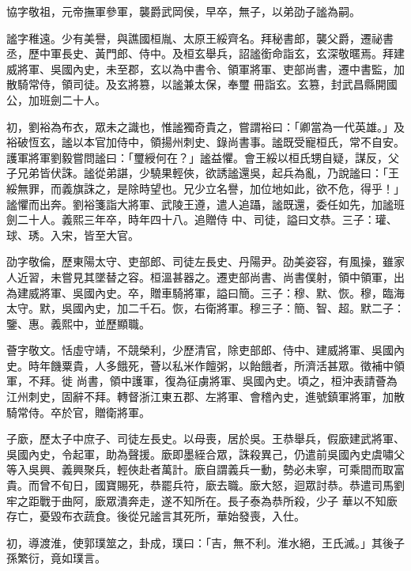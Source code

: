 \begin{pinyinscope}
 協字敬祖，元帝撫軍參軍，襲爵武岡侯，早卒，無子，以弟劭子謐為嗣。



 謐字稚遠。少有美譽，與譙國桓胤、太原王綏齊名。拜秘書郎，襲父爵，遷祕書丞，歷中軍長史、黃門郎、侍中。及桓玄舉兵，詔謐銜命詣玄，玄深敬暱焉。拜建威將軍、吳國內史，未至郡，玄以為中書令、領軍將軍、吏部尚書，遷中書監，加散騎常侍，領司徒。及玄將篡，以謐兼太保，奉璽
 冊詣玄。玄篡，封武昌縣開國公，加班劍二十人。



 初，劉裕為布衣，眾未之識也，惟謐獨奇貴之，嘗謂裕曰：「卿當為一代英雄。」及裕破恆玄，謐以本官加侍中，領揚州刺史、錄尚書事。謐既受寵桓氏，常不自安。護軍將軍劉毅嘗問謐曰：「璽綬何在？」謐益懼。會王綏以桓氏甥自疑，謀反，父子兄弟皆伏誅。謐從弟諶，少驍果輕俠，欲誘謐還吳，起兵為亂，乃說謐曰：「王綏無罪，而義旗誅之，是除時望也。兄少立名譽，加位地如此，欲不危，得乎！」謐懼而出奔。劉裕箋詣大將軍、武陵王遵，遣人追躡，謐既還，委任如先，加謐班劍二十人。義熙三年卒，時年四十八。追贈侍
 中、司徒，謚曰文恭。三子：瓘、球、琇。入宋，皆至大官。



 劭字敬倫，歷東陽太守、吏部郎、司徒左長史、丹陽尹。劭美姿容，有風操，雖家人近習，未嘗見其墜替之容。桓溫甚器之。遷吏部尚書、尚書僕射，領中領軍，出為建威將軍、吳國內史。卒，贈車騎將軍，謚曰簡。三子：穆、默、恢。穆，臨海太守。默，吳國內史，加二千石。恢，右衛將軍。穆三子：簡、智、超。默二子：鑒、惠。義熙中，並歷顯職。



 薈字敬文。恬虛守靖，不競榮利，少歷清官，除吏部郎、侍中、建威將軍、吳國內史。時年饑粟貴，人多餓死，薈以私米作饘粥，以飴餓者，所濟活甚眾。徵補中領軍，不拜。徙
 尚書，領中護軍，復為征虜將軍、吳國內史。頃之，桓沖表請薈為江州刺史，固辭不拜。轉督浙江東五郡、左將軍、會稽內史，進號鎮軍將軍，加散騎常侍。卒於官，贈衛將軍。



 子廞，歷太子中庶子、司徒左長史。以母喪，居於吳。王恭舉兵，假廞建武將軍、吳國內史，令起軍，助為聲援。廞即墨絰合眾，誅殺異己，仍遣前吳國內史虞嘯父等入吳興、義興聚兵，輕俠赴者萬計。廞自謂義兵一動，勢必未寧，可乘間而取富貴。而曾不旬日，國寶賜死，恭罷兵符，廞去職。廞大怒，迴眾討恭。恭遣司馬劉牢之距戰于曲阿，廞眾潰奔走，遂不知所在。長子泰為恭所殺，少子
 華以不知廞存亡，憂毀布衣蔬食。後從兄謐言其死所，華始發喪，入仕。



 初，導渡淮，使郭璞筮之，卦成，璞曰：「吉，無不利。淮水絕，王氏滅。」其後子孫繁衍，竟如璞言。




\end{pinyinscope}
